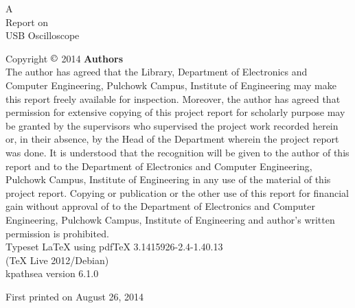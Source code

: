 \begin{flushleft}


\begin{Huge}

A\\
Report on\\
USB Oscilloscope\\[2cm]

\end{Huge}
Copyright $\copyright$ 2014 \textbf{Authors}\\[2cm]

The author has agreed that the Library, Department of Electronics and Computer
Engineering, Pulchowk Campus, Institute of Engineering may make this report freely
available for inspection. Moreover, the author has agreed that permission for
extensive copying of this project report for scholarly purpose may be granted by the
supervisors who supervised the project work recorded herein or, in their absence, by
the Head of the Department wherein the project report was done. It is understood that
the recognition will be given to the author of this report and to the Department of
Electronics and Computer Engineering, Pulchowk Campus, Institute of Engineering
in any use of the material of this project report. Copying or publication or the other
use of this report for financial gain without approval of to the Department of
Electronics and Computer Engineering, Pulchowk Campus, Institute of Engineering
and author’s written permission is prohibited.\\[1cm]
Typeset \LaTeX {} using pdfTeX 3.1415926-2.4-1.40.13\\
(TeX Live 2012/Debian)\\
kpathsea version 6.1.0


\vfill
First printed on August 26, 2014

\end{flushleft}
